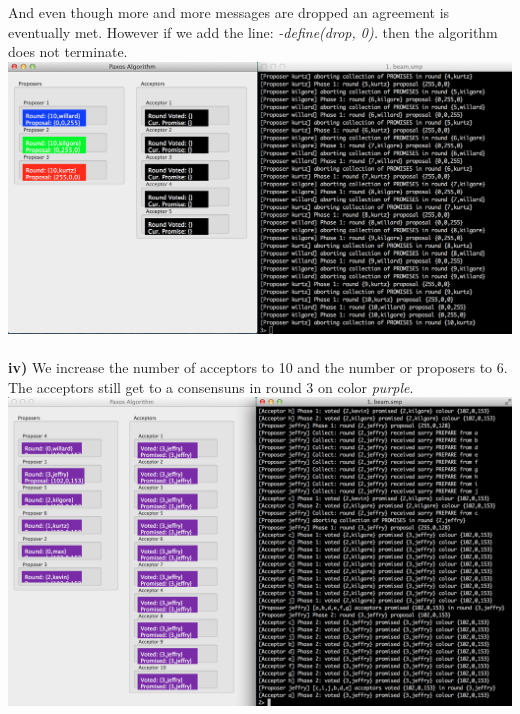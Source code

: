 \documentclass[a4paper, 11pt]{article}
\begin{document}
And even though more and more messages are dropped an agreement is eventually met. However if we add the line: \textit{-define(drop, 0).} then the algorithm does not terminate.\\
\includegraphics[scale=0.35]{images/exp7-drop0.png} \\\\
\newpage
\textbf{iv)} We increase the number of acceptors to 10 and the number or proposers to 6. The acceptors still get to a consensuns in round 3 on color \textit{purple}.\\
\includegraphics[scale=0.30]{images/exp8.png} \\\\
\end{document}
